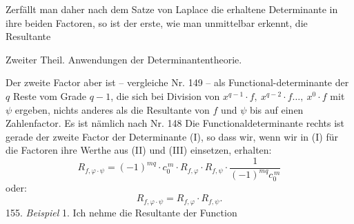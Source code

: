 Zerf\"allt man daher nach dem Satze von Laplace die erhaltene Determinante in ihre beiden Factoren, so ist der erste, wie man unmittelbar erkennt, die Resultante


Zweiter Theil. Anwendungen der Determinantentheorie.

Der zweite Factor aber ist -- vergleiche Nr. 149 -- als Functional-determinante der $q$ Reste vom Grade $q-1$, die sich bei Division von $x^{q-1}\cdot f,\ x^{q-2}\cdot f\ldots,\ x^0\cdot f$ mit $\psi$ ergeben, nichts anderes als die Resultante von $f$ und $\psi$ bis auf einen Zahlenfactor. Es ist n\"amlich nach Nr. 148
Die Functionaldeterminante rechts ist gerade der zweite Factor der Determinante (I), so dass wir, wenn wir in (I) f\"ur die Factoren ihre Werthe aus (II) und (III) einsetzen, erhalten:
\[
R_{f,\varphi\cdot\psi} = (-1)^{mq}\cdot c_0^{\,m}\cdot R_{f,\varphi}\cdot R_{f,\psi}\cdot \frac{1}{(-1)^{mq}c_0^{\,m}}
\]
oder:
\[
R_{f,\varphi\cdot\psi} = R_{f,\varphi}\cdot R_{f,\psi}.
\]
155. \textit{Beispiel} 1. Ich nehme die Resultante der Function
